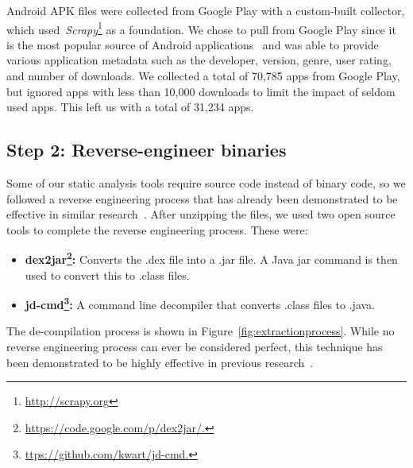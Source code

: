 \documentclass{sig-alternate}
\begin{document}
Android APK files were collected from Google Play with a custom-built collector, which used~\emph{Scrapy}\footnote{\url{http://scrapy.org}} as a foundation. We chose to pull from Google Play since it is the most popular source of Android applications~\cite{listofstores_URL} and was able to provide various application metadata such as the developer, version, genre, user rating, and number of downloads. We collected a total of 70,785 apps from Google Play, but ignored apps with less than 10,000 downloads to limit the impact of seldom used apps. This left us with a total of 31,234 apps.

\subsection{Step 2: Reverse-engineer binaries}
\label{sec: decompliation}
Some of our static analysis tools require source code instead of binary code, so we followed a reverse engineering process that has already been demonstrated to be effective in similar research~\cite{Lee_2013,6687155}. After unzipping the files, we used two open source tools to complete the reverse engineering process. These were:


\begin{itemize}
    \setlength{\itemsep}{0pt} %
    \setlength{\parskip}{0pt} %
    \setlength{\parsep}{0pt}  %

  \item \textbf{dex2jar\footnote{\url{https://code.google.com/p/dex2jar/.}}:} Converts the .dex file into a .jar file. A Java jar command is then used to convert this to .class files.
  \item \textbf{jd-cmd\footnote{\url{ttps://github.com/kwart/jd-cmd.}}:} A command line decompiler that converts .class files to .java.
\end{itemize}

The de-compilation process is shown in Figure~\ref{fig:extractionprocess}. While no reverse engineering process can ever be considered perfect, this technique has been demonstrated to be highly effective in previous research~\cite{apvrille2012android,chawla2014transfiguring}.




\end{document}

